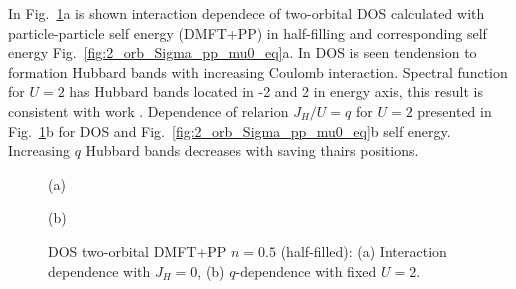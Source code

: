In Fig.~\ref{fig:2_orb_DOS_pp_mu0_eq}a is shown interaction dependece of two-orbital DOS calculated with particle-particle self energy (DMFT+PP) in half-filling and corresponding self energy Fig.~\ref{fig:2_orb_Sigma_pp_mu0_eq}a. In DOS is seen tendension to formation Hubbard bands with increasing Coulomb interaction. Spectral function for $U=2$ has Hubbard bands located in -2 and 2 in energy axis, this result is consistent with work \citet{2005JPCM...17...61D}. Dependence of relarion $J_H/U=q$ for $U=2$ presented in Fig.~\ref{fig:2_orb_DOS_pp_mu0_eq}b for DOS and Fig.~\ref{fig:2_orb_Sigma_pp_mu0_eq}b self energy. Increasing $q$ Hubbard bands decreases with saving thairs positions. 
\begin{figure}[h!]
\begin{minipage}[h]{0.5\linewidth}
 (a) \\
\end{minipage}
\hfill
\begin{minipage}[h]{0.5\linewidth}
 (b) \\
\end{minipage}
\caption{DOS two-orbital DMFT+PP $n=0.5$ (half-filled): (a) Interaction dependence with $J_{H}=0$, (b) $q$-dependence with fixed $U=2$.}
\label{fig:2_orb_DOS_pp_mu0_eq}
\end{figure}

